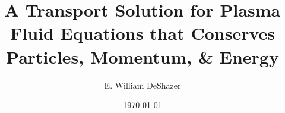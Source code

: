 \documentclass[]{article}
\title{A Transport Solution for Plasma Fluid Equations that Conserves Particles, Momentum, \& Energy}
\author{E. William DeShazer}
\date{\today}
\begin{document}
\maketitle

\mbox{}

















\clearpage

\printnomenclature

\printglossary

\printbibliography
\end{document}
